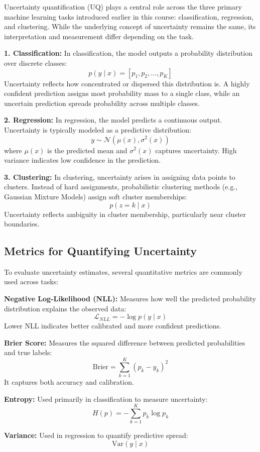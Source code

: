 \documentclass{article}
\begin{document}
Uncertainty quantification (UQ) plays a central role across the three primary machine learning tasks introduced earlier in this course: classification, regression, and clustering. While the underlying concept of uncertainty remains the same, its interpretation and measurement differ depending on the task.

\textbf{1. Classification:}  
In classification, the model outputs a probability distribution over discrete classes:
\[
p(y \mid x) = [p_1, p_2, \dots, p_K]
\]
Uncertainty reflects how concentrated or dispersed this distribution is. A highly confident prediction assigns most probability mass to a single class, while an uncertain prediction spreads probability across multiple classes.

\textbf{2. Regression:}  
In regression, the model predicts a continuous output. Uncertainty is typically modeled as a predictive distribution:
\[
y \sim \mathcal{N}(\mu(x), \sigma^2(x))
\]
where $\mu(x)$ is the predicted mean and $\sigma^2(x)$ captures uncertainty. High variance indicates low confidence in the prediction.

\textbf{3. Clustering:}  
In clustering, uncertainty arises in assigning data points to clusters. Instead of hard assignments, probabilistic clustering methods (e.g., Gaussian Mixture Models) assign soft cluster memberships:
\[
p(z = k \mid x)
\]
Uncertainty reflects ambiguity in cluster membership, particularly near cluster boundaries.

\subsection{Metrics for Quantifying Uncertainty}

To evaluate uncertainty estimates, several quantitative metrics are commonly used across tasks:

\textbf{Negative Log-Likelihood (NLL):}  
Measures how well the predicted probability distribution explains the observed data:
\[
\mathcal{L}_{NLL} = -\log p(y \mid x)
\]
Lower NLL indicates better calibrated and more confident predictions.

\textbf{Brier Score:}  
Measures the squared difference between predicted probabilities and true labels:
\[
\text{Brier} = \sum_{k=1}^{K} (p_k - y_k)^2
\]
It captures both accuracy and calibration.

\textbf{Entropy:}  
Used primarily in classification to measure uncertainty:
\[
H(p) = -\sum_{k=1}^{K} p_k \log p_k
\]

\textbf{Variance:}  
Used in regression to quantify predictive spread:
\[
\text{Var}(y \mid x)
\]
\end{document}
